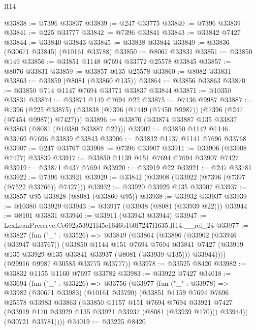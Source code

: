 \begin{lexlean}{R14}
\begin{coremodule}
@33838 := @7396 @33837
@33839 := @247 @33775
@33840 := @7396 @33839
@33841 := @225 @33777
@33842 := @7396 @33841
@33843 := @33842 @7427
@33844 := @33840 @33843
@33845 := @33838 @33844
@33849 := @33836 (@30671 @33845) (@10161 @33788)
@33850 := @8067 @33831
@33851 := @33850 @149
@33856 := @33851 @1148 @7694 @33772 @25578 @33845
@33857 := @8076 @33831
@33859 := @33857 @135 @25578
@33860 := @8082 @33831
@33863 := @33859 (@8081 (@33860 @135))
@33864 := @33856 @33863
@33870 := @33850 @714 @1147 @7694 @33771 @33837 @33844
@33871 := @10350 @33831
@33874 := @33871 @149 @7694 @22
@33875 := @7436 @9987
@33887 := @7396
    (@225 @33875)
    (@33838 (@7396 (@7449 (@7450 @9987)) (@7396 (@247 (@7454 @9987)) @7427)))
@33896 := @33870 (@33874 @33887 @135 @33837 @33863 (@8081 (@10380 @33887 @22)))
@33902 := @33850 @1142 @1146 @33769 @7696 @33839 @33843
@33906 := @33832 @1137 @1141 @7696 @33768
@33907 := @247 @33767
@33908 := @7396 @33907
@33911 := @33906 (@33908 @7427) @33839
@33917 := @33850 @1139 @151 @7694 @7694 @33907 @7427
@33919 := @33871 @437 @7694
@33920 := @33919 @22
@33921 := @247 @33781
@33922 := @7396 @33921
@33929 := @33842 (@33908 (@33922 (@7396 (@7397 (@7522 @33766)) @7427)))
@33932 := @33920 @33929 @135 @33907
@33937 := @33857 @95 @33828 (@8081 (@33860 @95))
@33938 := @33932 @33937
@33939 := @10380 @33929
@33943 := @33917 (@33938 (@8081 (@33939 @22)))
@33944 := @8101 @33831
@33946 := @33911 (@33943 @33944)
@33947 := LexLeanPreserve.Cc692a53921f45e1646b1b0f7247f1635.R14.__rel_24
@33977 := @33827
    (fun ("_" : @33526) =>
    @33849
      (@33864
        (@33896
          (@33902
            (@33946 (@33947 @33767))
            (@33850
              @1144
              @151
              @7694
              @7694
              @33841
              @7427
              (@33919 @135 @33929 @135 @33841 @33937 (@8081 (@33939 @135)))
              @33944))))
      (@29916 @9987 @30585 @33775 @33777))
@33978 := @33525 @8420
@33982 := @33832 @1155 @1160 @7697 @33782
@33983 := @33922 @7427
@34018 := @33694
    (fun ("_" : @33226) =>
    @33756
      (@33977
        (fun ("_" : @33978) =>
        @33982
          (@30671 @33983)
          (@10161 @33790)
          (@33851
            @1159
            @7694
            @7696
            @25578
            @33983
            @33863
            (@33850
              @1157
              @151
              @7694
              @7694
              @33921
              @7427
              (@33919 @170 @33929 @135 @33921 @33937 (@8081 (@33939 @170)))
              @33944))
          (@30721 @33781))))
@34019 := @33225 @8420

\end{coremodule}
\end{lexlean}
